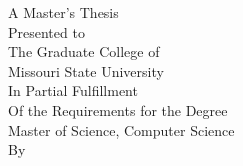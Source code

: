\thispagestyle{empty}
  \doublespace
  \begin{center}
    \textbf{{\thesistitle}}

    A Master's Thesis\\
    Presented to\\
    The Graduate College of\\
    Missouri State University\\

    In Partial Fulfillment\\
    Of the Requirements for the Degree\\
    Master of Science, Computer Science\\
    By\\
    \thesisstudent\\
    \thesisdate
  \end{center}
